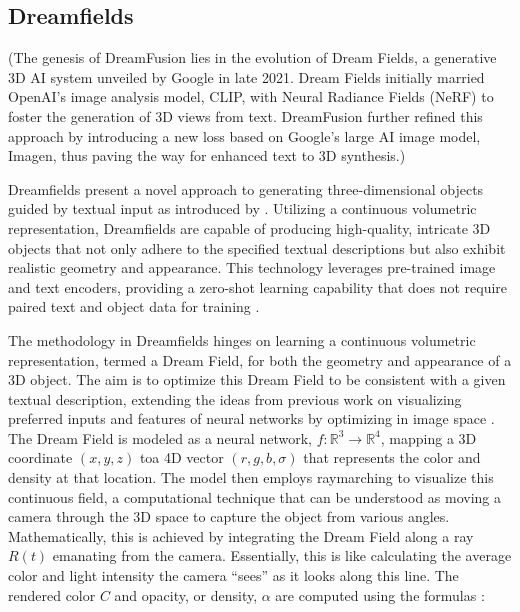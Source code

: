 \subsection{Dreamfields}\label{dreamfields}


(The genesis of DreamFusion lies in the evolution of Dream Fields, a generative 3D AI system unveiled by Google in late 2021. Dream Fields initially married OpenAI's image analysis model, CLIP, with Neural Radiance Fields (NeRF) to foster the generation of 3D views from text. DreamFusion further refined this approach by introducing a new loss based on Google's large AI image model, Imagen, thus paving the way for enhanced text to 3D synthesis.)


Dreamfields present a novel approach to generating three-dimensional objects guided by textual input as introduced by \citeauthor{jainDreamFields}. Utilizing a continuous volumetric representation, Dreamfields are capable of producing high-quality, intricate 3D objects that not only adhere to the specified textual descriptions but also exhibit realistic geometry and appearance. This technology leverages pre-trained image and text encoders, providing a zero-shot learning capability that does not require paired text and object data for training \citep{jainDreamFields}.

The methodology in Dreamfields hinges on learning a continuous volumetric representation, termed a Dream Field, for both the geometry and appearance of a 3D object. The aim is to optimize this Dream Field to be consistent with a given textual description, extending the ideas from previous work on visualizing preferred inputs and features of neural networks by optimizing in image space \citep{jainDreamFields}. The Dream Field is modeled as a neural network, \( f: \mathbb{R}^3 \rightarrow \mathbb{R}^4 \), mapping a 3D coordinate \( (x, y, z) \) toa 4D vector \( (r, g, b, \sigma) \) that represents the color and density at that location. The model then employs raymarching to visualize this continuous field, a computational technique that can be understood as moving a camera through the 3D space to capture the object from various angles. Mathematically, this is achieved by integrating the Dream Field along a ray \( R(t) \) emanating from the camera. Essentially, this is like calculating the average color and light intensity the camera ``sees'' as it looks along this line. The rendered color \( C \) and opacity, or density, \( \alpha \) are computed using the formulas \citep{jainDreamFields}:

